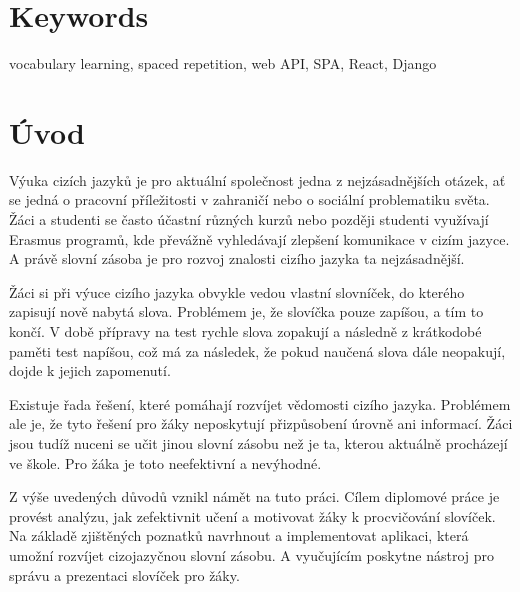 \documentclass[a4paper,11pt,titlepage,fleqn]{article}
\begin{document}

\section*{Keywords}
vocabulary learning, spaced repetition, web API, SPA, React, Django

\thispagestyle{empty}

\newpage
\thispagestyle{empty}
\setcounter{tocdepth}{2}
\tableofcontents


\newpage
\thispagestyle{empty}
\listoffigures
\listoftables
\renewcommand{\lstlistingname}{Ukázka kódu}
\renewcommand{\lstlistlistingname}{Seznam ukázek zdrojových kódů}
\lstlistoflistings

\newpage
\thispagestyle{empty}
\printglossary[title=Seznam zkratek]
\cleardoublepage

\section{Úvod}
    Výuka cizích jazyků je pro aktuální společnost jedna z nejzásadnějších otázek, ať se jedná o pracovní příležitosti v zahraničí nebo o sociální problematiku světa. Žáci a studenti se často účastní různých kurzů nebo později studenti využívají Erasmus programů, kde převážně vyhledávají zlepšení komunikace v cizím jazyce. A právě slovní zásoba je pro rozvoj znalosti cizího jazyka ta nejzásadnější.

    Žáci si při výuce cizího jazyka obvykle vedou vlastní slovníček, do kterého zapisují nově nabytá slova. Problémem je, že slovíčka pouze zapíšou, a tím to končí. V době přípravy na test rychle slova zopakují a následně z krátkodobé paměti test napíšou, což má za následek, že pokud naučená slova dále neopakují, dojde k jejich zapomenutí. 

    Existuje řada řešení, které pomáhají rozvíjet vědomosti cizího jazyka. Problémem ale je, že tyto řešení pro žáky neposkytují přizpůsobení úrovně ani informací. Žáci jsou tudíž nuceni se učit jinou slovní zásobu než je ta, kterou aktuálně procházejí ve škole. Pro žáka je toto neefektivní a nevýhodné.

    Z výše uvedených důvodů vznikl námět na tuto práci. Cílem diplomové práce je provést analýzu, jak zefektivnit učení a motivovat žáky k procvičování slovíček. Na základě zjištěných poznatků navrhnout a implementovat aplikaci, která umožní rozvíjet cizojazyčnou slovní zásobu. A vyučujícím poskytne nástroj pro správu a prezentaci slovíček pro žáky. 
\end{document}
